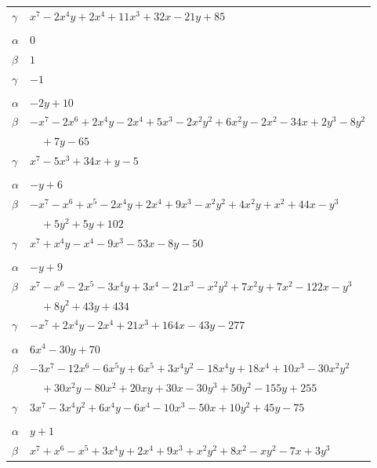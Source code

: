 \documentclass[11pt]{article}
\begin{document}
\begin{longtable}{@{}ll@{}}
$\gamma$ & $x^{7}-2x^{4}y+2x^{4}+11x^{3}+32x-21y+85$\\
\addlinespace[3pt]
\multicolumn{2}{@{}l}{$\{i,j\}=\{12,17\}$, $k_{ij}=1$}\\
$\alpha$ & $0$\\
$\beta$ & $1$\\
$\gamma$ & $-1$\\
\addlinespace[3pt]
\multicolumn{2}{@{}l}{$\{i,j\}=\{12,26\}$, $k_{ij}=2^{4}\cdot 5$}\\
$\alpha$ & $-2y+10$\\
$\beta$ & $-x^{7}-2x^{6}+2x^{4}y-2x^{4}+5x^{3}-2x^{2}y^{2}+6x^{2}y-2x^{2}-34x+2y^{3}-8y^{2}$\\
 & $\quad +7y-65$\\
$\gamma$ & $x^{7}-5x^{3}+34x+y-5$\\
\addlinespace[3pt]
\multicolumn{2}{@{}l}{$\{i,j\}=\{13,14\}$, $k_{ij}=2^{2}\cdot 3^{3}$}\\
$\alpha$ & $-y+6$\\
$\beta$ & $-x^{7}-x^{6}+x^{5}-2x^{4}y+2x^{4}+9x^{3}-x^{2}y^{2}+4x^{2}y+x^{2}+44x-y^{3}$\\
 & $\quad +5y^{2}+5y+102$\\
$\gamma$ & $x^{7}+x^{4}y-x^{4}-9x^{3}-53x-8y-50$\\
\addlinespace[3pt]
\multicolumn{2}{@{}l}{$\{i,j\}=\{13,21\}$, $k_{ij}=2^{4}\cdot 3^{2}\cdot 5$}\\
$\alpha$ & $-y+9$\\
$\beta$ & $x^{7}-x^{6}-2x^{5}-3x^{4}y+3x^{4}-21x^{3}-x^{2}y^{2}+7x^{2}y+7x^{2}-122x-y^{3}$\\
 & $\quad +8y^{2}+43y+434$\\
$\gamma$ & $-x^{7}+2x^{4}y-2x^{4}+21x^{3}+164x-43y-277$\\
\addlinespace[3pt]
\multicolumn{2}{@{}l}{$\{i,j\}=\{13,26\}$, $k_{ij}=2^{4}\cdot 5^{2}$}\\
$\alpha$ & $6x^{4}-30y+70$\\
$\beta$ & $-3x^{7}-12x^{6}-6x^{5}y+6x^{5}+3x^{4}y^{2}-18x^{4}y+18x^{4}+10x^{3}-30x^{2}y^{2}$\\
 & $\quad +30x^{2}y-80x^{2}+20xy+30x-30y^{3}+50y^{2}-155y+255$\\
$\gamma$ & $3x^{7}-3x^{4}y^{2}+6x^{4}y-6x^{4}-10x^{3}-50x+10y^{2}+45y-75$\\
\addlinespace[3pt]
\multicolumn{2}{@{}l}{$\{i,j\}=\{14,24\}$, $k_{ij}=1$}\\
$\alpha$ & $y+1$\\
$\beta$ & $x^{7}+x^{6}-x^{5}+3x^{4}y+2x^{4}+9x^{3}+x^{2}y^{2}+8x^{2}-xy^{2}-7x+3y^{3}$\\

\end{longtable}
\end{document}
